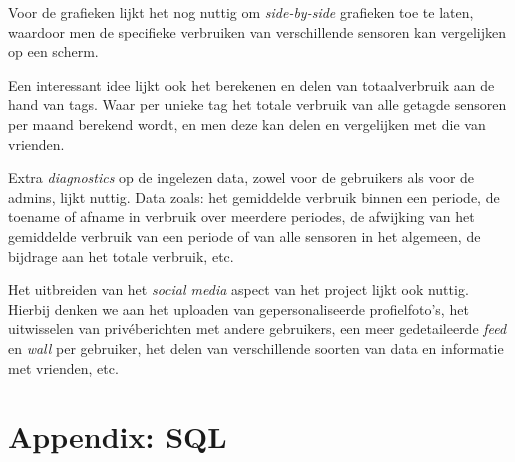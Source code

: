\documentclass[12pt,parskip=full]{article}
\begin{document}
Voor de grafieken lijkt het nog nuttig om \emph{side-by-side} grafieken toe te laten, waardoor men de specifieke verbruiken van verschillende sensoren kan vergelijken op een scherm.

Een interessant idee lijkt ook het berekenen en delen van totaalverbruik aan de hand van tags. Waar per unieke tag het totale verbruik van alle getagde sensoren per maand berekend wordt, en men deze kan delen en vergelijken met die van vrienden.

Extra \emph{diagnostics} op de ingelezen data, zowel voor de gebruikers als voor de admins, lijkt nuttig. Data zoals: het gemiddelde verbruik binnen een periode, de toename of afname in verbruik over meerdere periodes, de afwijking van het gemiddelde verbruik van een periode of van alle sensoren in het algemeen, de bijdrage aan het totale verbruik, etc.

Het uitbreiden van het \emph{social media} aspect van het project lijkt ook nuttig. Hierbij denken we aan het uploaden van gepersonaliseerde profielfoto's, het uitwisselen van privéberichten met andere gebruikers, een meer gedetaileerde \emph{feed} en \emph{wall} per gebruiker, het delen van verschillende soorten van data en informatie met vrienden, etc.


\pagebreak
{}
\section{Appendix: SQL}
\label{dbschema}
\lstset{language=SQL,basicstyle=\ttfamily}


\pagebreak
\def\arraystretch{1.8}
\newcommand{\argu}[1]{\textbf{<\textit{#1}>}}
\newcommand{\getallDesc}[1]{Toont een JSON-lijst van alle \code{#1} records.}
\newcommand{\getDesc}[1]{Toont de \code{#1} met de gegeven ID.}
\newcommand{\insertDesc}[1]{Leest een \code{#1{}Data} JSON-object uit de
  request body, en maakt een nieuwe \code{#1} aan in de database.}
\newcommand{\deleteDesc}[1]{Verwijdert de \code{#1} met
  de gegeven ID uit de database.}
\newcommand{\crud}[3]{
  \code{GET /api/{#1}} & \getallDesc{#2} \\
  \code{GET /api/{#1}/\argu{#3}} & \getDesc{#2} \\
  \code{POST /api/{#1}} & \insertDesc{#2} \\
  \code{DELETE /api/{#1}/\argu{#3}} & \deleteDesc{#2}
}

\newcommand{\compact}[1]{
    \code{PUT /api/compact/{#1} /\argu{from}/\argu{to}} & Geeft de server de opdracht om \emph{compaction} toe te passen op de \code{#1} \emph{tier}, tijdens de periode tussen \code{from} en \code{to}.
}
\newcommand{\periodAverage}[3]{
\hline
  \code{GET /api/#1-average\newline/\argu{id}/\argu{time}}
  & Levert een gemiddelde op van alle data uit de gegeven \code{Sensor}, over 
  #2 bij de gegeven time\-stamp \code{time} hoort. \\
  \code{GET /api/#1-average\newline/\argu{id}/\argu{time}/\argu{n}}
  & Levert $n$ gemiddelden op, beginnende bij #2 bij \code{time} 
  hoort, gevolgd door de $n-1$ volgende #3{}gemiddelden.
}
\end{document}
